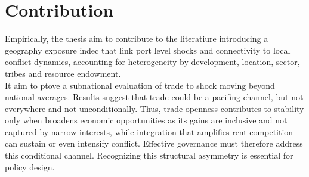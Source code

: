 \section{Contribution}
Empirically, the thesis aim to contribute to the literatiure introducing a geography exposure indec that link port level shocks and connectivity to local conflict dynamics, accounting for heterogeneity by development, location, sector, tribes and resource endowment. \\
It aim to ptove a subnational evaluation of trade to shock moving beyond national averages. Results suggest that trade could be a pacifing channel, but not everywhere and not unconditionally. Thus, trade openness contributes to stability only when broadens economic opportunities as its gains are inclusive and not captured by narrow interests, while integration that amplifies rent competition can sustain or even intensify conflict. Effective governance must therefore address this conditional channel. Recognizing this structural asymmetry is essential for policy design.
